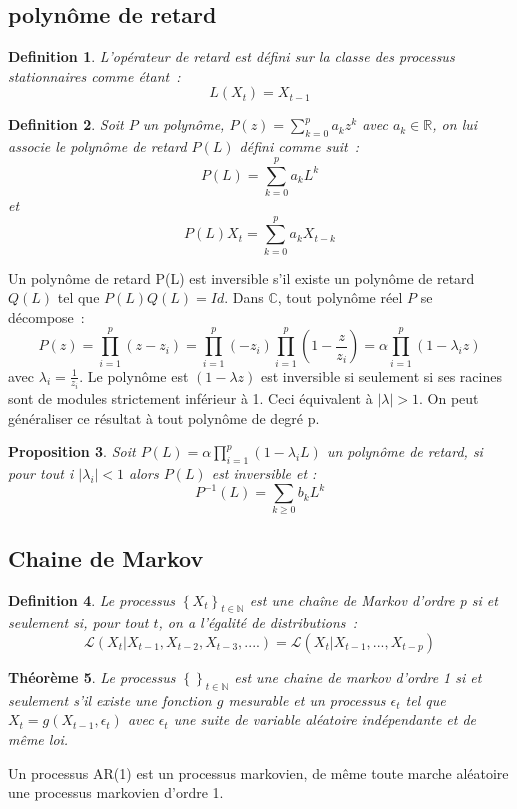 \documentclass[11pt]{scrartcl} %
\newtheorem{theorem}{Théorème}[section]
\newtheorem{Def}[theorem]{Definition}
\newtheorem{pro}[theorem]{Proposition}
\begin{document}
\subsection{polynôme de retard}
\begin{Def}
L'opérateur de retard est défini sur la classe des processus stationnaires comme étant~: 
$$
L(X_t)=X_{t-1}
$$
\end{Def}
\begin{Def}
Soit $P$ un polynôme, $P(z)=\sum_{k=0}^{p}a_kz^k$ avec $a_k\in\mathbb{R}$, on lui associe le polynôme de retard $P(L)$ défini comme suit~:
$$
P(L)=\sum_{k=0}^pa_kL^k
$$
et 
$$
P(L)X_t=\sum_{k=0}^pa_kX_{t-k}
$$
\end{Def}
Un polynôme de retard P(L) est inversible s'il existe un polynôme de retard $Q(L)$ tel que $P(L)Q(L)=Id$. Dans $\mathbb{C}$, tout polynôme réel $P$ se décompose~:
$$
P(z)=\prod_{i=1}^p(z-z_i)=\prod_{i=1}^p(-z_i)\prod_{i=1}^p(1-\frac{z}{z_i})=\alpha\prod_{i=1}^p(1-\lambda_i z)
$$
avec $\lambda_i=\frac{1}{z_i}$.
Le polynôme est $(1-\lambda z)$ est inversible si seulement si ses racines sont de modules strictement inférieur à 1. Ceci équivalent à $|\lambda|>1$. On peut généraliser ce résultat à tout polynôme de degré p.
\begin{pro}
Soit $P(L) = \alpha\prod_{i=1}^p(1-\lambda_i L)$ un polynôme de retard, si pour tout i $|\lambda_i|<1$ alors $P(L)$ est inversible et :
$$
P^{-1}(L)= \sum_{k\geq 0}b_kL^k
$$
\end{pro}

\subsection{Chaine de Markov}
\begin{Def}
Le processus $\left\{X_t\right\}_{t\in\mathbb{N}}$ est une chaîne de Markov d'ordre p si et seulement si, pour tout $t$, on a l'égalité de distributions~:
$$
\mathcal{L}\left(X_t|X_{t-1},X_{t-2},X_{t-3},....\right) = \mathcal{L}\left(X_t|X_{t-1},...,X_{t-p}\right)
$$
\end{Def}
\begin{theorem}
Le processus $\left\{\right\}_{t\in\mathbb{N}}$ est une chaine de markov d'ordre 1 si et seulement s'il existe une fonction $g$ mesurable et un processus $\epsilon_t$ tel que $X_t=g(X_{t-1},\epsilon_t)$ avec $\epsilon_t$ une suite de variable aléatoire indépendante et de même loi.
\end{theorem}
Un processus AR(1) est un processus markovien, de même toute marche aléatoire une processus markovien d'ordre 1.
\end{document}
